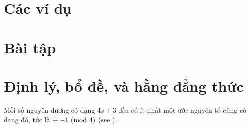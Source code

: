 \documentclass[../imo-training-open-book.tex]{subfiles}
\begin{document}
\newpage

\section{Các ví dụ}

 \newpage

\section{Bài tập}



\newpage

\section{Định lý, bổ đề, và hằng đẳng thức}

\begin{theorem}
    \label{theorem:prime-divisor-4k3}
    Mỗi số nguyên dương có dạng \(4s + 3\) đều có ít nhất một ước nguyên tố cũng có dạng đó, tức là \(\equiv -1 \ (\mathrm{mod}\ 4)\)
    (see ).
\end{theorem}
\end{document}
